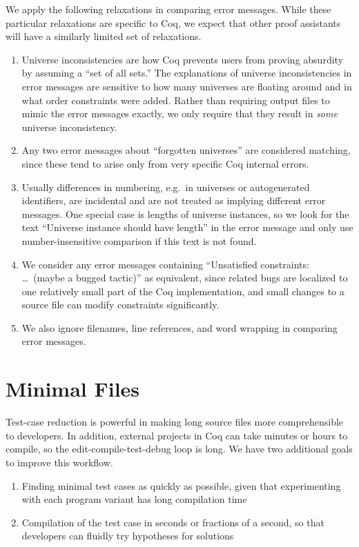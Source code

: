 \documentclass[a4paper,USenglish,cleveref,autoref,thm-restate,pdfa]{lipics-v2021}
\begin{document}
We apply the following relaxations in comparing error messages.
While these particular relaxations are specific to Coq, we expect that other proof assistants will have a similarly limited set of relaxations.
\begin{enumerate}

\item Universe inconsistencies are how Coq prevents users from proving absurdity by assuming a ``set of all sets.''
The explanations of universe inconsistencies in error messages are sensitive to how many universes are floating around and in what order constraints were added.
Rather than requiring output files to mimic the error messages exactly, we only require that they result in \emph{some} universe inconsistency.

\item Any two error messages about ``forgotten universes'' are considered matching, since these tend to arise only from very specific Coq internal errors.

\item Usually differences in numbering, e.g.\ in universes or autogenerated identifiers, are incidental and are not treated as implying different error messages.  One special case is lengths of universe instances, so we look for the text ``Universe instance should have length'' in the error message and only use number-insensitive comparison if this text is not found.

\item We consider any error messages containing ``Unsatisfied constraints: \ldots\ (maybe a bugged tactic)'' as equivalent, since related bugs are localized to one relatively small part of the Coq implementation, and small changes to a source file can modify constraints significantly.

\item We also ignore filenames, line references, and word wrapping in comparing error messages.

\end{enumerate}

\section{Minimal Files}\label{sec:minimal}

Test-case reduction is powerful in making long source files more comprehensible to developers.
In addition, external projects in Coq can take minutes or hours to compile, so the edit-compile-test-debug loop is long.
We have two additional goals to improve this workflow.
\begin{enumerate}
\item Finding minimal test cases as quickly as possible, given that experimenting with each program variant has long compilation time
\item Compilation of the test case in seconds or fractions of a second, so that developers can fluidly try hypotheses for solutions
\end{enumerate}
\end{document}
